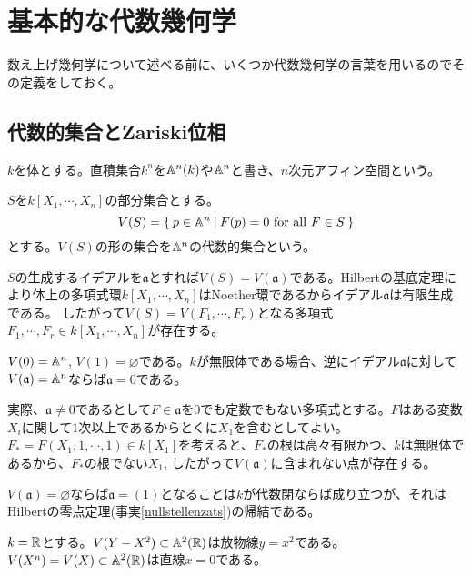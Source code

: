 \documentclass{ltjsreport}
\begin{document}
\section{基本的な代数幾何学}


数え上げ幾何学について述べる前に、いくつか代数幾何学の言葉を用いるのでその定義をしておく。

\subsection{代数的集合とZariski位相}
\begin{defin}
  $k$を体とする。直積集合$k^n$を$\mathbb{A}^n(k)$や$\mathbb{A}^n$と書き、$n$次元アフィン空間という。
\end{defin}

\begin{defin}
  $S$を$k[X_1,\cdots,X_n]$の部分集合とする。
  \[
  V(S)=\left\{\:p\in\mathbb{A}^n\:\middle|\:F(p)=0\text{ for all }F\in S\:\right\}  
  \]
  とする。$V(S)$の形の集合を$\mathbb{A}^n$の代数的集合という。
\end{defin}

$S$の生成するイデアルを$\mathfrak{a}$とすれば$V(S)=V(\mathfrak{a})$である。Hilbertの基底定理により体上の多項式環$k[X_1,\cdots,X_n]$はNoether環であるからイデアル$\mathfrak{a}$は有限生成である。
したがって$V(S)=V(F_1,\cdots,F_r)$となる多項式$F_1,\cdots,F_r\in k[X_1,\cdots,X_n]$が存在する。

\begin{eg}\label{rei1}
  $V(0)=\mathbb{A}^n$, $V(1)=\varnothing$である。$k$が無限体である場合、逆にイデアル$\mathfrak{a}$に対して$V(\mathfrak{a})=\mathbb{A}^n$ならば$\mathfrak{a}=0$である。
  
  実際、$\mathfrak{a}\neq 0$であるとして$F\in\mathfrak{a}$を$0$でも定数でもない多項式とする。$F$はある変数$X_i$に関して$1$次以上であるからとくに$X_1$を含むとしてよい。$F_*=F(X_1,1,\cdots,1)\in k[X_1]$を考えると、$F_*$の根は高々有限かつ、$k$は無限体であるから、$F_*$の根でない$X_1$, したがって$V(\mathfrak{a})$に含まれない点が存在する。

  $V(\mathfrak{a})=\varnothing$ならば$\mathfrak{a}=(1)$となることは$k$が代数閉ならば成り立つが、それはHilbertの零点定理(事実\ref{nullstellenzats})の帰結である。
\end{eg}

\begin{eg}
  $k=\mathbb{R}$とする。$V(Y-X^2)\subset\mathbb{A}^2(\mathbb{R})$は放物線$y=x^2$である。$V(X^n)=V(X)\subset \mathbb{A}^2(\mathbb{R})$は直線$x=0$である。
\end{eg}
\end{document}
